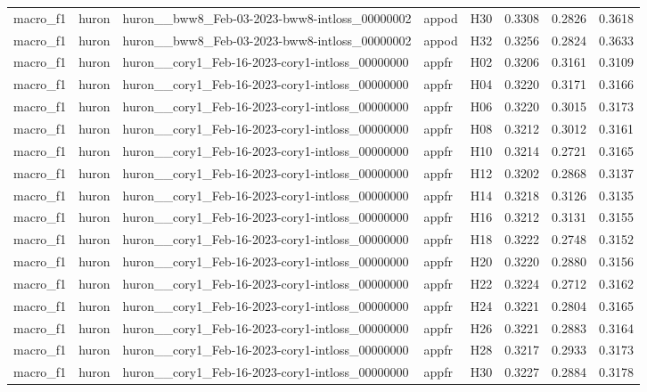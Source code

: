 \begin{table}[tbp]
\begin{tabular}{lllllrrr}
macro\_f1 & huron & huron\_\_bww8\_Feb-03-2023-bww8-intloss\_00000002 & appod & H30 & 0.3308 & 0.2826 & 0.3618 \\
macro\_f1 & huron & huron\_\_bww8\_Feb-03-2023-bww8-intloss\_00000002 & appod & H32 & 0.3256 & 0.2824 & 0.3633 \\
macro\_f1 & huron & huron\_\_cory1\_Feb-16-2023-cory1-intloss\_00000000 & appfr & H02 & 0.3206 & 0.3161 & 0.3109 \\
macro\_f1 & huron & huron\_\_cory1\_Feb-16-2023-cory1-intloss\_00000000 & appfr & H04 & 0.3220 & 0.3171 & 0.3166 \\
macro\_f1 & huron & huron\_\_cory1\_Feb-16-2023-cory1-intloss\_00000000 & appfr & H06 & 0.3220 & 0.3015 & 0.3173 \\
macro\_f1 & huron & huron\_\_cory1\_Feb-16-2023-cory1-intloss\_00000000 & appfr & H08 & 0.3212 & 0.3012 & 0.3161 \\
macro\_f1 & huron & huron\_\_cory1\_Feb-16-2023-cory1-intloss\_00000000 & appfr & H10 & 0.3214 & 0.2721 & 0.3165 \\
macro\_f1 & huron & huron\_\_cory1\_Feb-16-2023-cory1-intloss\_00000000 & appfr & H12 & 0.3202 & 0.2868 & 0.3137 \\
macro\_f1 & huron & huron\_\_cory1\_Feb-16-2023-cory1-intloss\_00000000 & appfr & H14 & 0.3218 & 0.3126 & 0.3135 \\
macro\_f1 & huron & huron\_\_cory1\_Feb-16-2023-cory1-intloss\_00000000 & appfr & H16 & 0.3212 & 0.3131 & 0.3155 \\
macro\_f1 & huron & huron\_\_cory1\_Feb-16-2023-cory1-intloss\_00000000 & appfr & H18 & 0.3222 & 0.2748 & 0.3152 \\
macro\_f1 & huron & huron\_\_cory1\_Feb-16-2023-cory1-intloss\_00000000 & appfr & H20 & 0.3220 & 0.2880 & 0.3156 \\
macro\_f1 & huron & huron\_\_cory1\_Feb-16-2023-cory1-intloss\_00000000 & appfr & H22 & 0.3224 & 0.2712 & 0.3162 \\
macro\_f1 & huron & huron\_\_cory1\_Feb-16-2023-cory1-intloss\_00000000 & appfr & H24 & 0.3221 & 0.2804 & 0.3165 \\
macro\_f1 & huron & huron\_\_cory1\_Feb-16-2023-cory1-intloss\_00000000 & appfr & H26 & 0.3221 & 0.2883 & 0.3164 \\
macro\_f1 & huron & huron\_\_cory1\_Feb-16-2023-cory1-intloss\_00000000 & appfr & H28 & 0.3217 & 0.2933 & 0.3173 \\
macro\_f1 & huron & huron\_\_cory1\_Feb-16-2023-cory1-intloss\_00000000 & appfr & H30 & 0.3227 & 0.2884 & 0.3178 \\

\end{tabular}
\end{table}
